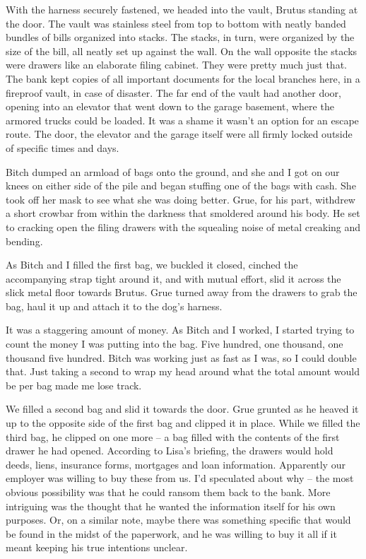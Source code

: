 With the harness securely fastened, we headed into the vault, Brutus standing at the door.  The vault was stainless steel from top to bottom with neatly banded bundles of bills organized into stacks.  The stacks, in turn, were organized by the size of the bill, all neatly set up against the wall. On the wall opposite the stacks were drawers like an elaborate filing cabinet.  They were pretty much just that.  The bank kept copies of all important documents for the local branches here, in a fireproof vault, in case of disaster.  The far end of the vault had another door, opening into an elevator that went down to the garage basement, where the armored trucks could be loaded.  It was a shame it wasn't an option for an escape route. The door, the elevator and the garage itself were all firmly locked outside of specific times and days.



Bitch dumped an armload of bags onto the ground, and she and I got on our knees on either side of the pile and began stuffing one of the bags with cash.  She took off her mask to see what she was doing better.  Grue, for his part, withdrew a short crowbar from within the darkness that smoldered around his body.  He set to cracking open the filing drawers with the squealing noise of metal creaking and bending.



As Bitch and I filled the first bag, we buckled it closed, cinched the accompanying strap tight around it, and with mutual effort, slid it across the slick metal floor towards Brutus. Grue turned away from the drawers to grab the bag, haul it up and attach it to the dog's harness.



It was a staggering amount of money. As Bitch and I worked, I started trying to count the money I was putting into the bag. Five hundred, one thousand, one thousand five hundred. Bitch was working just as fast as I was, so I could double that. Just taking a second to wrap my head around what the total amount would be per bag made me lose track.



We filled a second bag and slid it towards the door. Grue grunted as he heaved it up to the opposite side of the first bag and clipped it in place. While we filled the third bag, he clipped on one more – a bag filled with the contents of the first drawer he had opened.  According to Lisa's briefing, the drawers would hold deeds, liens, insurance forms, mortgages and loan information.  Apparently our employer was willing to buy these from us.  I'd speculated about why – the most obvious possibility was that he could ransom them back to the bank.  More intriguing was the thought that he wanted the information itself for his own purposes.  Or, on a similar note, maybe there was something specific that would be found in the midst of the paperwork, and he was willing to buy it all if it meant keeping his true intentions unclear.




